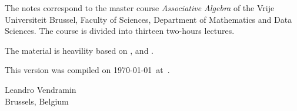 \preface

The notes correspond to the master  
course \emph{Associative Algebra} of the 
Vrije Universiteit Brussel, 
Faculty of Sciences, 
Department of Mathematics and Data Sciences. The course
is divided into thirteen two-hours lectures. 

The material is heavility based on \cite{MR3308118}, \cite{MR1449137} and 
\cite{MR798076}. 


This version 
was compiled on \today~at~\currenttime.

\bigskip
\begin{flushright}
Leandro Vendramin\\Brussels, Belgium\par
\end{flushright}
